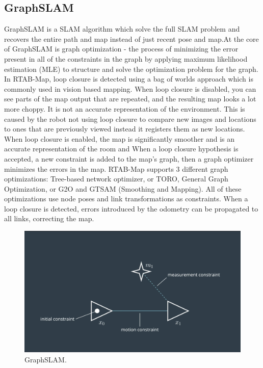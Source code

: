 \documentclass[10pt,journal,compsoc]{IEEEtran}
\begin{document}
\subsection{GraphSLAM}
GraphSLAM is a SLAM algorithm which solve the full SLAM problem and recovers the entire path and map instead of just recent pose and map.At the core of GraphSLAM is graph optimization - the process of minimizing the error present in all of the constraints in the graph by applying maximum likelihood estimation (MLE) to structure and solve the optimization problem for the graph.
In RTAB-Map, loop closure is detected using a bag of worlds approach which is commonly used in vision based mapping. When loop closure is disabled, you can see parts of the map output that are repeated, and the resulting map looks a lot more choppy. It is not an accurate representation of the environment. This is caused by the robot not using loop closure to compare new images and locations to ones that are previously viewed instead it registers them as new locations. When loop closure is enabled, the map is significantly smoother and is an accurate representation of the room and When a loop closure hypothesis is accepted, a new constraint is added to the map’s graph, then a graph optimizer minimizes the errors in the map. RTAB-Map supports 3 different graph optimizations: Tree-based network optimizer, or TORO, General Graph Optimization, or G2O and GTSAM (Smoothing and Mapping). All of these optimizations use node poses and link transformations as constraints. When a loop closure is detected, errors introduced by the odometry can be propagated to all links, correcting the map.
\begin{figure}[thpb]
      \centering
      \includegraphics[width=\linewidth]{GraphSLAM.png}
      \caption{GraphSLAM.}
      \label{fig:robot1}
\end{figure}
\end{document}
